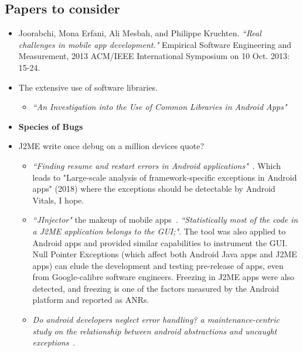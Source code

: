 \subsection{Papers to consider}
\begin{itemize}
    \item Joorabchi, Mona Erfani, Ali Mesbah, and Philippe Kruchten. \emph{``Real challenges in mobile app development."} Empirical Software Engineering and Measurement, 2013 ACM/IEEE International Symposium on 10 Oct. 2013: 15-24.~\citep{joorabchi2013_real_challenges_in_mobile_app_development}
    
    \item The extensive use of software libraries. 
    \begin{itemize}
        \item \emph{``An Investigation into the Use of Common Libraries in Android Apps"}~\citep{li2016_an_investigation_into_the_use_of_common_libraries_in_android_apps}
    \end{itemize}
    
    \item \textbf{Species of Bugs}
    \item J2ME write once debug on a million devices quote?
    \begin{itemize}
        \item \emph{``Finding resume and restart errors in Android applications"}~\cite{shan2016finding}. Which leads to "Large-scale analysis of framework-specific exceptions in Android apps" (2018) where the exceptions should be detectable by Android Vitals, I hope.
        \item \emph{``JInjector"} the makeup of mobile apps~\citep{sama2009using_jinjector}. \emph{``Statistically most of the code in a J2ME application belongs to the GUI;"}. The tool was also applied to Android apps and provided similar capabilities to instrument the GUI. Null Pointer Exceptions (which affect both Android Java apps and J2ME apps) can elude the development and testing pre-release of apps, even from Google-calibre software engineers. Freezing in J2ME apps were also detected, and freezing is one of the factors measured by the Android platform and reported as ANRs.
        \item \emph{Do android developers neglect error handling? a maintenance-centric study on the relationship between android abstractions and uncaught exceptions}~\citep{Oliveira_Borges_Silva_Cacho_Castor_2018_android_error_handling}.
    \end{itemize}
\end{itemize}

